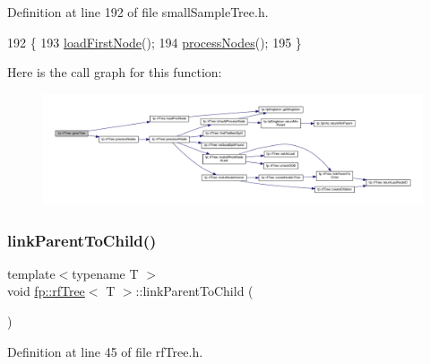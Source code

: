 Definition at line 192 of file small\+Sample\+Tree.\+h.


\begin{DoxyCode}
192                                \{
193                     \hyperlink{classfp_1_1rfTree_a8757adc28b68d0a99f95b8bc5d6a38db}{loadFirstNode}();
194                     \hyperlink{classfp_1_1rfTree_a7997df3477bc9f73163384c8cd0bcec9}{processNodes}();
195                 \}
\end{DoxyCode}
Here is the call graph for this function\+:
\nopagebreak
\begin{figure}[H]
\begin{center}
\leavevmode
\includegraphics[width=350pt]{classfp_1_1rfTree_a196d6006e7e2ee0575fa40d7d4621712_cgraph}
\end{center}
\end{figure}
\mbox{\label{classfp_1_1rfTree_aceaedc5d54bb429c1a3539f164a93d45}} 
\subsubsection{\texorpdfstring{link\+Parent\+To\+Child()}{linkParentToChild()}\hspace{0.1cm}{\footnotesize\ttfamily [1/2]}}
{\footnotesize\ttfamily template$<$typename T $>$ \\
void \hyperlink{classfp_1_1rfTree}{fp\+::rf\+Tree}$<$ T $>$\+::link\+Parent\+To\+Child (\begin{DoxyParamCaption}{ }\end{DoxyParamCaption})\hspace{0.3cm}{\ttfamily [inline]}}



Definition at line 45 of file rf\+Tree.\+h.


